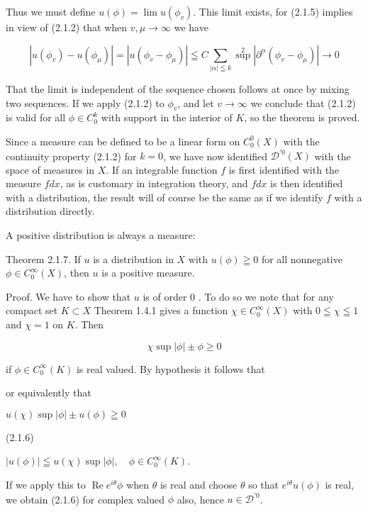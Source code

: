 Thus we must define $u(\phi)=\lim u\left(\phi_{v}\right)$. This limit exists, for (2.1.5) implies in view of (2.1.2) that when $v, \mu \rightarrow \infty$ we have

\[
\left|u\left(\phi_{v}\right)-u\left(\phi_{\mu}\right)\right|=\left|u\left(\phi_{v}-\phi_{\mu}\right)\right| \leqq C \sum_{|\alpha| \leqq k} \sup ^{2}\left|\partial^{\alpha}\left(\phi_{v}-\phi_{\mu}\right)\right| \rightarrow 0
\]

That the limit is independent of the sequence chosen follows at once by mixing two sequences. If we apply (2.1.2) to $\phi_{v}$, and let $v \rightarrow \infty$ we conclude that (2.1.2) is valid for all $\phi \in C_{0}^{k}$ with support in the interior of $K$, so the theorem is proved.

Since a measure can be defined to be a linear form on $C_{0}^{0}(X)$ with the continuity property (2.1.2) for $k=0$, we have now identified $\mathscr{D}^{\prime 0}(X)$ with the space of measures in $X$. If an integrable function $f$ is first identified with the measure $f d x$, as is customary in integration theory, and $f d x$ is then identified with a distribution, the result will of course be the same as if we identify $f$ with a distribution directly.

A positive distribution is always a measure:

Theorem 2.1.7. If $u$ is a distribution in $X$ with $u(\phi) \geqq 0$ for all nonnegative $\phi \in C_{0}^{\infty}(X)$, then $u$ is a positive measure.

Proof. We have to show that $u$ is of order 0 . To do so we note that for any compact set $K \subset X$ Theorem 1.4.1 gives a function $\chi \in C_{0}^{\infty}(X)$ with $0 \leqq \chi \leqq 1$ and $\chi=1$ on $K$. Then

\[
\chi \sup |\phi| \pm \phi \geq 0
\]

if $\phi \in C_{0}^{\infty}(K)$ is real valued. By hypothesis it follows that

or equivalently that

$u(\chi) \sup |\phi| \pm u(\phi) \geqq 0$

(2.1.6)

$|u(\phi)| \leqq u(\chi) \sup |\phi|, \quad \phi \in C_{0}^{\infty}(K)$.

If we apply this to $\operatorname{Re} e^{i \theta} \phi$ when $\theta$ is real and choose $\theta$ so that $e^{i \theta} u(\phi)$ is real, we obtain (2.1.6) for complex valued $\phi$ also, hence $u \in \mathscr{D}^{\prime 0}$.

